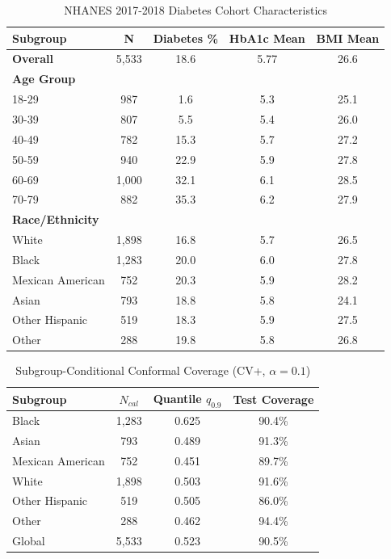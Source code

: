 
\begin{table}[htbp]
\centering
\caption{NHANES 2017-2018 Diabetes Cohort Characteristics}
\label{tab:cohort}
\begin{tabular}{lcccc}
\toprule
Subgroup & N & Diabetes \% & HbA1c Mean & BMI Mean \\
\midrule
\textbf{Overall} & 5,533 & 18.6 & 5.77 & 26.6 \\
\midrule
\textbf{Age Group} & & & & \\
18-29 & 987 & 1.6 & 5.3 & 25.1 \\
30-39 & 807 & 5.5 & 5.4 & 26.0 \\
40-49 & 782 & 15.3 & 5.7 & 27.2 \\
50-59 & 940 & 22.9 & 5.9 & 27.8 \\
60-69 & 1,000 & 32.1 & 6.1 & 28.5 \\
70-79 & 882 & 35.3 & 6.2 & 27.9 \\
\midrule
\textbf{Race/Ethnicity} & & & & \\
White & 1,898 & 16.8 & 5.7 & 26.5 \\
Black & 1,283 & 20.0 & 6.0 & 27.8 \\
Mexican American & 752 & 20.3 & 5.9 & 28.2 \\
Asian & 793 & 18.8 & 5.8 & 24.1 \\
Other Hispanic & 519 & 18.3 & 5.9 & 27.5 \\
Other & 288 & 19.8 & 5.8 & 26.8 \\
\bottomrule
\end{tabular}
\end{table}



\begin{table}[htbp]
\centering
\caption{Subgroup-Conditional Conformal Coverage (CV+, $\alpha=0.1$)}
\label{tab:conformal}
\begin{tabular}{lccc}
\toprule
Subgroup & $N_{cal}$ & Quantile $q_{0.9}$ & Test Coverage \\
\midrule
Black & 1,283 & 0.625 & 90.4\% \\
Asian & 793 & 0.489 & 91.3\% \\
Mexican American & 752 & 0.451 & 89.7\% \\
White & 1,898 & 0.503 & 91.6\% \\
Other Hispanic & 519 & 0.505 & 86.0\% \\
Other & 288 & 0.462 & 94.4\% \\
\midrule
Global & 5,533 & 0.523 & 90.5\% \\
\bottomrule
\end{tabular}
\end{table}



